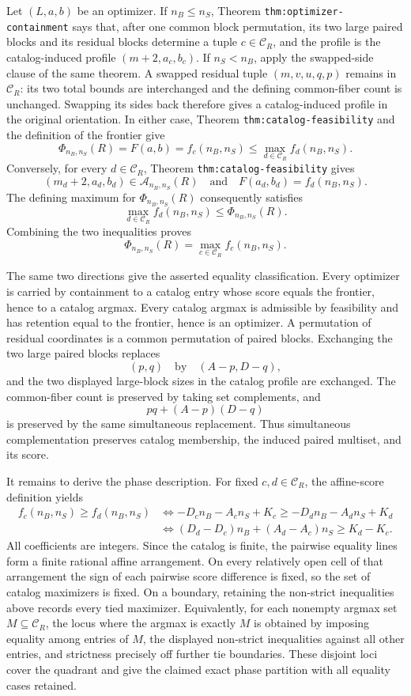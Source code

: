 Let \((L,a,b)\) be an optimizer. If \(n_B\le n_S\), Theorem \texttt{thm:optimizer-containment} says that, after one common block permutation, its two large paired blocks and its residual blocks determine a tuple \(c\in\mathcal C_R\), and the profile is the catalog-induced profile \((m+2,a_c,b_c)\). If \(n_S<n_B\), apply the swapped-side clause of the same theorem. A swapped residual tuple \((m,v,u,q,p)\) remains in \(\mathcal C_R\): its two total bounds are interchanged and the defining common-fiber count is unchanged. Swapping its sides back therefore gives a catalog-induced profile in the original orientation. In either case, Theorem \texttt{thm:catalog-feasibility} and the definition of the frontier give
\[
\Phi_{n_B,n_S}(R)
=F(a,b)
=f_c(n_B,n_S)
\le \max_{d\in\mathcal C_R}f_d(n_B,n_S).
\]
Conversely, for every \(d\in\mathcal C_R\), Theorem \texttt{thm:catalog-feasibility} gives
\[
(m_d+2,a_d,b_d)\in\mathcal A_{n_B,n_S}(R)
\quad\text{and}\quad
F(a_d,b_d)=f_d(n_B,n_S).
\]
The defining maximum for \(\Phi_{n_B,n_S}(R)\) consequently satisfies
\[
\max_{d\in\mathcal C_R}f_d(n_B,n_S)
\le \Phi_{n_B,n_S}(R).
\]
Combining the two inequalities proves
\[
\Phi_{n_B,n_S}(R)=\max_{c\in\mathcal C_R}f_c(n_B,n_S).
\]

The same two directions give the asserted equality classification. Every optimizer is carried by containment to a catalog entry whose score equals the frontier, hence to a catalog argmax. Every catalog argmax is admissible by feasibility and has retention equal to the frontier, hence is an optimizer. A permutation of residual coordinates is a common permutation of paired blocks. Exchanging the two large paired blocks replaces
\[
(p,q)\quad\text{by}\quad(A-p,D-q),
\]
and the two displayed large-block sizes in the catalog profile are exchanged. The common-fiber count is preserved by taking set complements, and
\[
pq+(A-p)(D-q)
\]
is preserved by the same simultaneous replacement. Thus simultaneous complementation preserves catalog membership, the induced paired multiset, and its score.

It remains to derive the phase description. For fixed \(c,d\in\mathcal C_R\), the affine-score definition yields
\[
\begin{aligned}
f_c(n_B,n_S)\ge f_d(n_B,n_S)
&\Longleftrightarrow
-D_cn_B-A_cn_S+K_c\ge-D_dn_B-A_dn_S+K_d\\
&\Longleftrightarrow
(D_d-D_c)n_B+(A_d-A_c)n_S\ge K_d-K_c.
\end{aligned}
\]
All coefficients are integers. Since the catalog is finite, the pairwise equality lines form a finite rational affine arrangement. On every relatively open cell of that arrangement the sign of each pairwise score difference is fixed, so the set of catalog maximizers is fixed. On a boundary, retaining the non-strict inequalities above records every tied maximizer. Equivalently, for each nonempty argmax set \(M\subseteq\mathcal C_R\), the locus where the argmax is exactly \(M\) is obtained by imposing equality among entries of \(M\), the displayed non-strict inequalities against all other entries, and strictness precisely off further tie boundaries. These disjoint loci cover the quadrant and give the claimed exact phase partition with all equality cases retained.
